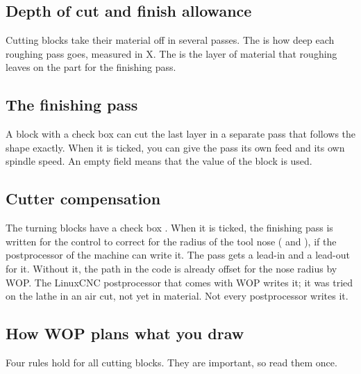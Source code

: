 \subsection{Depth of cut and finish allowance}
Cutting blocks take their material off in several passes. The  is how deep each roughing pass goes, measured in X. The  is the layer of material that roughing leaves on the part for the finishing pass.

\subsection{The finishing pass}
A block with a  check box can cut the last layer in a separate pass that follows the shape exactly. When it is ticked, you can give the pass its own feed and its own spindle speed. An empty field means that the value of the block is used.

\subsection{Cutter compensation}
The turning blocks have a check box . When it is ticked, the finishing pass is written for the control to correct for the radius of the tool nose ( and ), if the postprocessor of the machine can write it. The pass gets a lead-in and a lead-out for it. Without it, the path in the code is already offset for the nose radius by WOP. The LinuxCNC postprocessor that comes with WOP writes it; it was tried on the lathe in an air cut, not yet in material. Not every postprocessor writes it.

\subsection{How WOP plans what you draw}
Four rules hold for all cutting blocks. They are important, so read them once.

